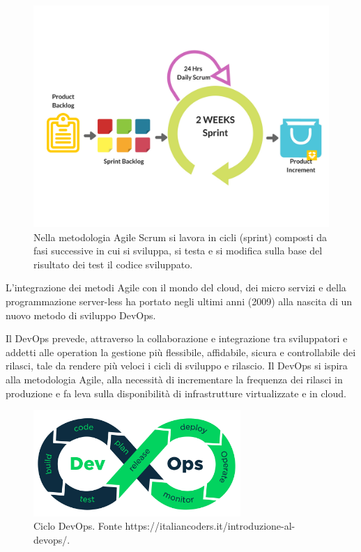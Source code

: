\begin{figure}[h!]
	\centering
	
		\includegraphics[width=\textwidth]{"../immagini/Scrum-Agile-Marketing"}
	\caption{Nella metodologia Agile Scrum si lavora in cicli (sprint) composti da fasi successive in cui si sviluppa, si testa e si modifica sulla base del risultato dei test il codice sviluppato.}
\end{figure}

L'integrazione dei metodi Agile con il mondo del cloud, dei micro servizi e della programmazione server-less ha portato negli ultimi anni (2009) alla nascita di un nuovo metodo di sviluppo DevOps.

Il DevOps prevede, attraverso la collaborazione e integrazione tra sviluppatori e addetti alle operation la gestione più flessibile, affidabile, sicura e controllabile dei rilasci, tale da rendere più veloci i cicli di sviluppo e rilascio. Il DevOps si ispira alla metodologia Agile, alla necessità di incrementare la frequenza dei rilasci in produzione e fa leva sulla disponibilità di infrastrutture virtualizzate e in cloud.

\begin{figure}[h!]
	\centering
	\includegraphics[width=0.7\textwidth]{"../immagini/devops-process"}
	\caption{Ciclo DevOps. Fonte https://italiancoders.it/introduzione-al-devops/.}
\end{figure}

